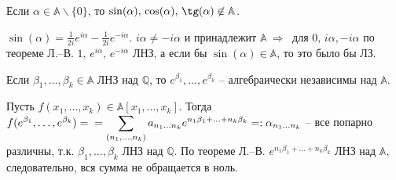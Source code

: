 \begin{corollary} \label{l14_cor4}
	Если $\alpha \in \mathbb{A} \backslash \{ 0 \}$, то $\sin(\alpha),\,\cos(\alpha),\,\tg(\alpha) \not\in \mathbb{A}$.
\end{corollary}
\begin{pf}
	$\sin(\alpha) = \frac{1}{2i}e^{i\alpha}-\frac{1}{2i}e^{-i\alpha}$. $i\alpha \ne -i\alpha$ и принадлежит $\mathbb{A} \ \Rightarrow \ $ для $0,\,i\alpha,-i\alpha$ по теореме Л.--В.
	$1,\,e^{i\alpha},\,e^{-i\alpha}$ ЛНЗ, а если бы $\sin(\alpha) \in \mathbb{A}$, то это было бы ЛЗ.
\end{pf}

\begin{corollary} \label{l14_cor5}
	Если $\beta_1,\dots,\beta_k \in \mathbb{A}$ ЛНЗ над $\mathbb{Q}$, то $e^{\beta_1},\dots,e^{\beta_k}$ -- алгебраически независимы над $\mathbb{A}$.
\end{corollary}
\begin{pf}
	Пусть $f(x_1,\dots,x_k) \in \mathbb{A}[x_1,\dots,x_k]$. Тогда $\displaystyle f(e^{\beta_1},\dots,e^{\beta_k}) = \\ = \sum\limits_{(n_1,\dots,n_k)} a_{n_1\dots n_k}e^{n_1\beta_1+...+n_k\beta_k} =: \alpha_{n_1\dots n_k}$ -- все попарно различны, т.к.
	$\beta_1,\dots,\beta_k$ ЛНЗ над $\mathbb{Q}$. По теореме Л.--В.
	$e^{n_1\beta_1+...+n_k\beta_k}$ ЛНЗ над $\mathbb{A}$, следовательно, вся сумма не обращается в ноль.
\end{pf}